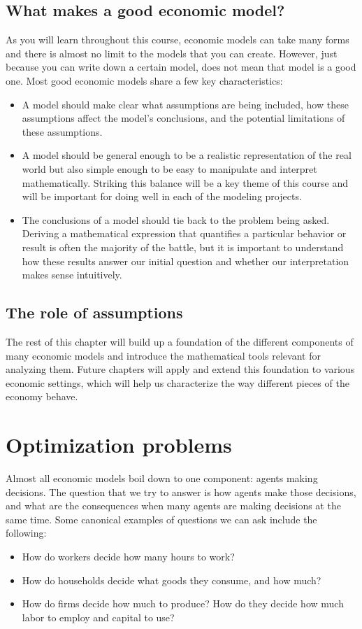 \subsection*{What makes a good economic model?}
As you will learn throughout this course, economic models can take many forms and there is almost no limit to the models that you can create. However, just because you can write down a certain model, does not mean that model is a good one. Most good economic models share a few key characteristics:
\begin{itemize}
    \item A model should make clear what assumptions are being included, how these assumptions affect the model's conclusions, and the potential limitations of these assumptions.
    \item A model should be general enough to be a realistic representation of the real world but also simple enough to be easy to manipulate and interpret mathematically. Striking this balance will be a key theme of this course and will be important for doing well in each of the modeling projects.
    \item The conclusions of a model should tie back to the problem being asked. Deriving a mathematical expression that quantifies a particular behavior or result is often the majority of the battle, but it is important to understand how these results answer our initial question and whether our interpretation makes sense intuitively.
\end{itemize}

\subsection*{The role of assumptions}

The rest of this chapter will build up a foundation of the different components of many economic models and introduce the mathematical tools relevant for analyzing them. Future chapters will apply and extend this foundation to various economic settings, which will help us characterize the way different pieces of the economy behave.

\section{Optimization problems}
Almost all economic models boil down to one component: agents making decisions. The question that we try to answer is how agents make those decisions, and what are the consequences when many agents are making decisions at the same time. Some canonical examples of questions we can ask include the following:
\begin{itemize}
    \item How do workers decide how many hours to work?
    \item How do households decide what goods they consume, and how much?
    \item How do firms decide how much to produce? How do they decide how much labor to employ and capital to use?
\end{itemize}

